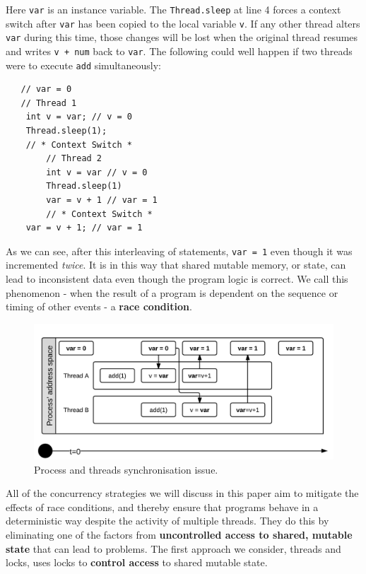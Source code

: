 \documentclass[a4paper,12pt]{kth-mag}
\begin{document}
Here \texttt{var} is an instance variable. The \texttt{Thread.sleep} at line 4 forces a context switch after \texttt{var} has been copied to the local variable \texttt{v}. If any other thread alters \texttt{var} during this time, those changes will be lost when the original thread resumes and writes \texttt{v + num} back to \texttt{var}. The following could well happen if two threads were to execute \texttt{add} simultaneously:

\begin{listing}[H]
	\begin{verbatim}
   // var = 0
   // Thread 1
    int v = var; // v = 0
    Thread.sleep(1);
    // * Context Switch *
        // Thread 2
        int v = var // v = 0
        Thread.sleep(1)
        var = v + 1 // var = 1
        // * Context Switch *
    var = v + 1; // var = 1
  	\end{verbatim}
\end{listing}

As we can see, after this interleaving of statements, \texttt{var = 1} even though it was incremented \textit{twice}. It is in this way that shared mutable memory, or state, can lead to inconsistent data even though the program logic is correct. We call this phenomenon - when the result of a program is dependent on the sequence or timing of other events - a \textbf{race condition}.

\begin{figure}[H]
\begin{center}
    \includegraphics{images/ProcessAndThreads.png}
\caption{Process and threads synchronisation issue.}\label{fig:pat_sync_issue}
\end{center}
\end{figure}

All of the concurrency strategies we will discuss in this paper aim to mitigate the effects of race conditions, and thereby ensure that programs behave in a deterministic way despite the activity of multiple threads. They do this by eliminating one of the factors from \textbf{uncontrolled access to shared, mutable state} that can lead to problems. The first approach we consider, threads and locks, uses locks to \textbf{control access} to shared mutable state.
\end{document}
